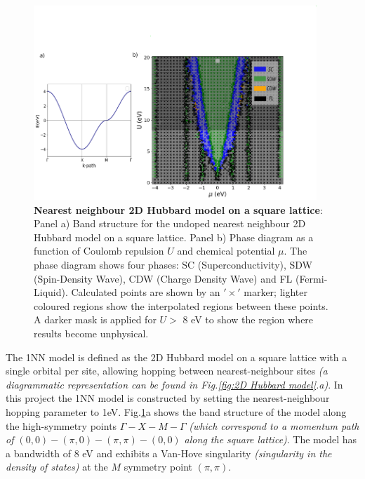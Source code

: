 \documentclass[11pt]{article}
\begin{document}
\begin{figure}[htbp]  %
    \centering
    \includegraphics[width=0.95\textwidth]{1NNphased.png}  %
    \caption{\textbf{Nearest neighbour 2D Hubbard model on a square lattice}: 
    Panel a) Band structure for the undoped nearest neighbour 2D Hubbard model on a square lattice.
    Panel b) Phase diagram as a function of Coulomb repulsion $U$ and chemical 
    potential $\mu$. The phase diagram shows four phases: SC (Superconductivity), SDW (Spin-Density Wave), CDW (Charge Density Wave) and FL (Fermi-Liquid).
    Calculated points are shown by an $'\times '$ marker; lighter coloured regions show the interpolated regions between these points. A darker mask is applied for $U > $ 8 eV to show the 
    region where results become unphysical.}

    \label{fig:1NNpd}
\end{figure} 


\noindent The 1NN model is defined as the 2D Hubbard model on a square lattice with a single orbital per site,  allowing hopping between nearest-neighbour sites \textit{(a diagrammatic representation can be found in Fig.\ref{fig:2D Hubbard model}.a)}. 
In this project the 1NN model is constructed by setting the nearest-neighbour hopping parameter to 1eV.
Fig.\ref{fig:1NNpd}a shows the band structure of the model along the high-symmetry points $\Gamma-X-M-\Gamma$ \textit{ (which correspond to a momentum path of $(0,0)-(\pi,0)-(\pi,\pi)-(0,0)$ along the square lattice)}.
The model has a bandwidth of 8 eV and exhibits a Van-Hove singularity \textit{(singularity in the density of states)} at the $M$ symmetry point \textit{$(\pi,\pi)$}. \par
\medskip
\end{document}
